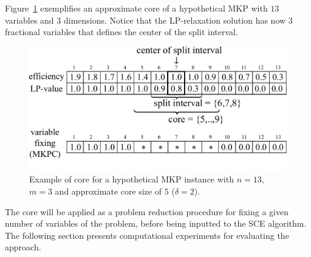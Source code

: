Figure~\ref{fig:mkpcore} exemplifies an approximate core of a hypothetical MKP
with $13$ variables and $3$ dimensions.
Notice that the LP-relaxation solution has now $3$ fractional variables that
defines the center of the split interval.

\begin{figure}[ht]
  \centering
  \includegraphics[scale=0.406]{img/sce/mkp_3}
  \caption{Example of core for a hypothetical MKP instance with $n=13$, $m=3$ and approximate core size of $5$ ($\delta = 2$).}
  \label{fig:mkpcore}
\end{figure}

The core will be applied as a problem reduction procedure
for fixing a given number of variables of the problem,
before being inputted to the SCE algorithm.
The following section presents computational experiments for
evaluating the approach.
